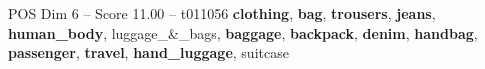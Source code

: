 \begin{textsample}{POS Dim 6 – Score 11.00 – t011056}  \label{ex:f6_pos_040}
\textbf{clothing}, \textbf{bag}, \textbf{trousers}, \textbf{jeans}, \textbf{human\_body}, luggage\_\&\_bags, \textbf{baggage}, \textbf{backpack}, \textbf{denim}, \textbf{handbag}, \textbf{passenger}, \textbf{travel}, \textbf{hand\_luggage}, suitcase

\end{textsample}
